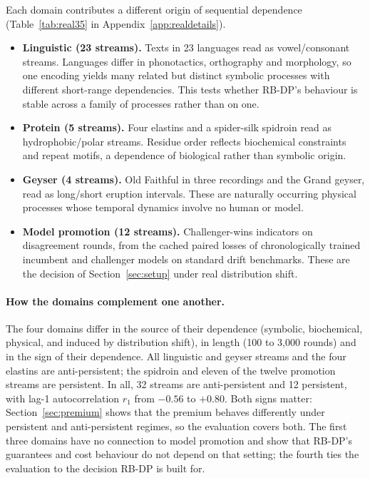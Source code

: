 \documentclass{article}
\theoremstyle{plain}
\theoremstyle{definition}
\theoremstyle{remark}
\begin{document}
Each domain contributes a different origin of sequential dependence (Table~\ref{tab:real35} in Appendix~\ref{app:realdetails}).
\begin{itemize}[leftmargin=*,itemsep=1pt,topsep=2pt]
\item \textbf{Linguistic (23 streams).} Texts in 23 languages read as vowel/consonant streams. Languages differ in phonotactics, orthography and morphology, so one encoding yields many related but distinct symbolic processes with different short-range dependencies. This tests whether RB-DP's behaviour is stable across a family of processes rather than on one.
\item \textbf{Protein (5 streams).} Four elastins and a spider-silk spidroin read as hydrophobic/polar streams. Residue order reflects biochemical constraints and repeat motifs, a dependence of biological rather than symbolic origin.
\item \textbf{Geyser (4 streams).} Old Faithful in three recordings \citep{azzalini1990faithful} and the Grand geyser, read as long/short eruption intervals. These are naturally occurring physical processes whose temporal dynamics involve no human or model.
\item \textbf{Model promotion (12 streams).} Challenger-wins indicators on disagreement rounds, from the cached paired losses of chronologically trained incumbent and challenger models on standard drift benchmarks. These are the decision of Section~\ref{sec:setup} under real distribution shift.
\end{itemize}

\paragraph{How the domains complement one another.} The four domains differ in the source of their dependence (symbolic, biochemical, physical, and induced by distribution shift), in length (100 to 3{,}000 rounds) and in the sign of their dependence. All linguistic and geyser streams and the four elastins are anti-persistent; the spidroin and eleven of the twelve promotion streams are persistent. In all, 32 streams are anti-persistent and 12 persistent, with lag-1 autocorrelation $r_1$ from $-0.56$ to $+0.80$. Both signs matter: Section~\ref{sec:premium} shows that the premium behaves differently under persistent and anti-persistent regimes, so the evaluation covers both. The first three domains have no connection to model promotion and show that RB-DP's guarantees and cost behaviour do not depend on that setting; the fourth ties the evaluation to the decision RB-DP is built for.
\end{document}
